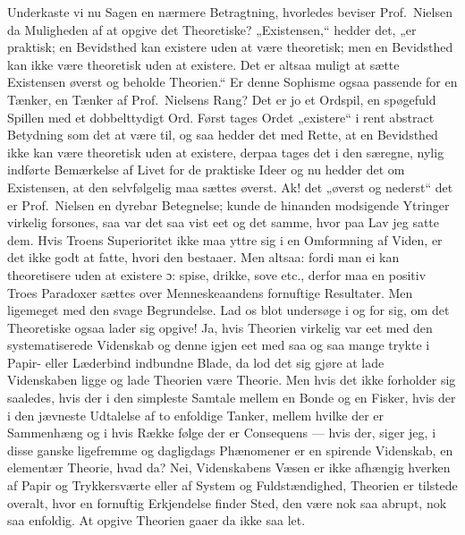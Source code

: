 Underkaste vi nu Sagen en nærmere Betragtning, hvorledes beviser Prof.\
Nielsen da Muligheden af at opgive det Theoretiske? „Existensen,“ hedder det,
„er praktisk; en Bevidsthed kan existere uden at være theoretisk; men en
Bevidsthed kan ikke være theoretisk uden at existere. Det er altsaa muligt at
sætte Existensen øverst og beholde Theorien.“ Er denne Sophisme ogsaa passende
for en Tænker, en Tænker
af Prof.\ Nielsens Rang? Det er jo et Ordspil, en spøgefuld Spillen
med et dobbelttydigt Ord. Først tages Ordet „existere“ i rent abstract
Betydning som det at være til, og saa hedder det med Rette, at en Bevidsthed
ikke kan være theoretisk uden at existere, derpaa tages det i den særegne,
nylig indførte Bemærkelse af Livet for de praktiske Ideer og nu hedder det om
Existensen, at den selvfølgelig maa sættes øverst. Ak! det „øverst og nederst“
det er Prof.\ Nielsen en dyrebar Betegnelse; kunde de hinanden modsigende
Ytringer virkelig forsones, saa var det saa vist eet og det samme, hvor paa
Lav jeg satte dem. Hvis Troens Superioritet ikke maa yttre sig i en Omformning
af Viden, er det ikke godt at fatte, hvori den bestaaer. Men altsaa: fordi man
ei kan theoretisere uden at existere ɔ: spise, drikke, sove etc., derfor maa
en positiv Troes Paradoxer sættes over Menneskeaandens fornuftige Resultater.
Men ligemeget med den svage Begrundelse. Lad os blot undersøge i og for sig,
om det Theoretiske ogsaa lader sig opgive! Ja, hvis Theorien virkelig var eet
med den systematiserede Videnskab og denne igjen eet med saa og saa mange
trykte i Papir- eller Læderbind indbundne Blade, da lod det sig gjøre at lade
Videnskaben ligge og lade Theorien være Theorie. Men hvis det ikke forholder
sig saaledes, hvis der i den simpleste Samtale mellem en Bonde og en Fisker,
hvis der i den jævneste Udtalelse af to enfoldige Tanker, mellem hvilke der er
Sammenhæng og i hvis Række%
følge der er Consequens --- hvis der, siger jeg, i disse ganske
ligefremme og dagligdags Phænomener er en spirende Videnskab, en elementær
Theorie, hvad da? Nei, Videnskabens Væsen er ikke afhængig hverken af Papir og
Trykkersværte eller af System og Fuldstændighed, Theorien er tilstede overalt,
hvor en fornuftig Erkjendelse finder Sted, den være nok saa abrupt, nok saa
enfoldig. At opgive Theorien gaaer da ikke saa let.

